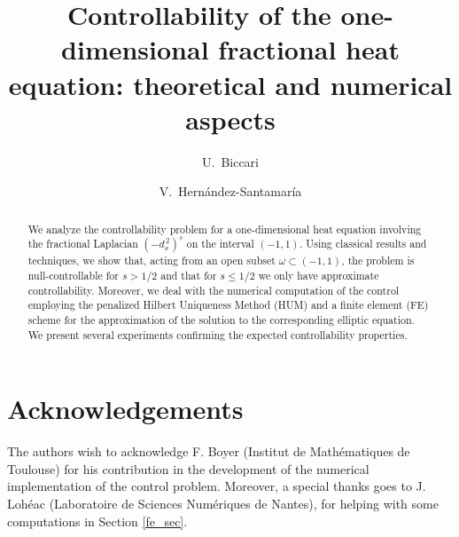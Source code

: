 \documentclass[preprint,1p]{amsart}
\title[Controllability fractional heat equation]{Controllability of the one-dimensional fractional heat equation: theoretical and numerical aspects}
\author{U.~Biccari}
\author{V.~Hern\'andez-Santamar\'ia}
\numberwithin{equation}{section}
\numberwithin{equation}{section}
\numberwithin{theorem}{section}
\numberwithin{remark}{section}
\numberwithin{lemma}{section}
\numberwithin{proposition}{section}
\numberwithin{definition}{section}
\newcommand{\fl}[2]{(-d_x^{\,2})^{#1}#2}
\begin{document}


\maketitle

\begin{abstract}
We analyze the controllability problem for a one-dimensional heat equation involving the fractional Laplacian $\fl{s}{}$ on the interval $(-1,1)$. Using classical results and techniques, we show that, acting from an open subset $\omega\subset(-1,1)$, the problem is null-controllable for $s>1/2$ and that for $s\leq 1/2$ we only have approximate controllability. Moreover, we deal with the numerical computation of the control employing the penalized Hilbert Uniqueness Method (HUM) and a finite element (FE) scheme for the approximation of the solution to the corresponding elliptic equation. We present several experiments confirming the expected controllability properties.
\end{abstract}








\section*{Acknowledgements}
The authors wish to acknowledge F. Boyer (Institut de Math\'ematiques de Toulouse) for his contribution in the development of the numerical implementation of the control problem. Moreover, a special thanks goes to J. Loh\'eac (Laboratoire de Sciences Num\'eriques de Nantes), for helping with some computations in Section \ref{fe_sec}.  


\end{document}
